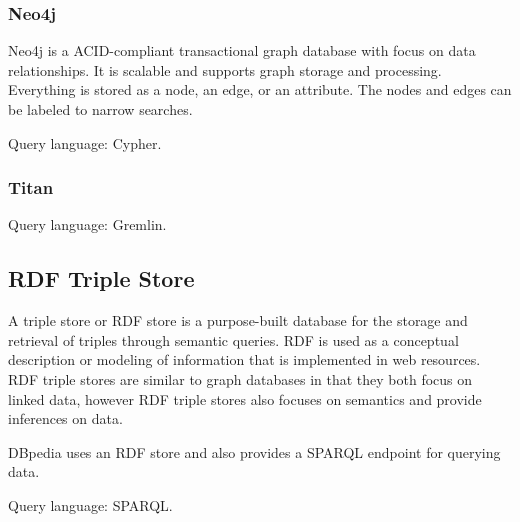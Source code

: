 \subsubsection{Neo4j}
Neo4j is a ACID-compliant transactional graph database with focus on data relationships. It is scalable and supports graph storage and processing. Everything is stored as a node, an edge, or an attribute. The nodes and edges can be labeled to narrow searches.

Query language: Cypher.

\subsubsection{Titan}
Query language: Gremlin.

\subsection{RDF Triple Store}
A triple store or RDF store is a purpose-built database for the storage and retrieval of triples through semantic queries. RDF is used as a conceptual description or modeling of information that is implemented in web resources. RDF triple stores are similar to graph databases in that they both focus on linked data, however RDF triple stores also focuses on semantics and provide inferences on data.

DBpedia uses an RDF store and also provides a SPARQL endpoint for querying data.

Query language: SPARQL.

